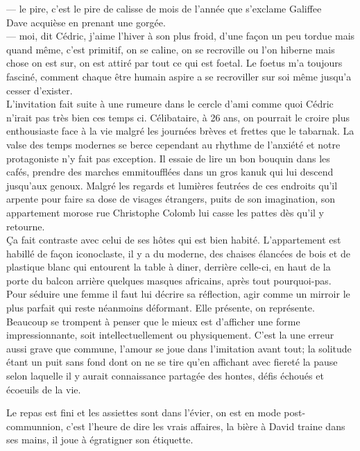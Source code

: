 \documentclass{article}
\begin{document}
--- le pire, c'est le pire de calisse de mois de l'année que s'exclame Galiffee\\
Dave acquièse en prenant une gorgée.\\
--- moi, dit Cédric, j'aime l'hiver à son plus froid, d'une façon un peu tordue mais quand même,
c'est primitif, on se caline, on se recroville ou l'on hiberne mais chose on est sur,
on est attiré par tout ce qui est foetal. Le foetus m'a toujours fasciné, comment
chaque être humain aspire a se recroviller sur soi même jusqu'a cesser d'exister.\\

L'invitation fait suite à une rumeure dans le cercle d'ami comme quoi Cédric
n'irait pas très bien ces temps ci. Célibataire, à 26 ans, on pourrait le croire
plus enthousiaste face à la vie malgré les journées brèves et frettes que le
tabarnak. La valse des temps modernes se berce cependant au rhythme de l'anxiété
et notre protagoniste n'y fait pas exception. Il essaie de lire un bon bouquin
dans les cafés, prendre des marches emmitoufflées dans un gros kanuk qui lui
descend jusqu'aux genoux. Malgré les regards et lumières feutrées de ces
endroits qu'il arpente pour faire sa dose de visages étrangers, puits de son
imagination, son appartement morose rue Christophe Colomb lui casse les pattes
dès qu'il y retourne.\\

Ça fait contraste avec celui de ses hôtes qui est bien habité. L'appartement est
habillé de façon iconoclaste, il y a du moderne, des chaises élancées de bois et
de plastique blanc qui entourent la table à diner, derrière celle-ci, en haut de
la porte du balcon arrière quelques masques africains, après tout
pourquoi-pas.\\

Pour séduire une femme il faut lui décrire sa réflection, agir comme un
mirroir le plus parfait qui reste néanmoins déformant. Elle présente,
on représente. Beaucoup se trompent à penser que le mieux est d'afficher
une forme impressionnante, soit intellectuellement ou physiquement. C'est
la une erreur aussi grave que commune, l'amour se joue dans l'imitation
avant tout; la solitude étant un puit sans fond dont on ne se tire qu'en
affichant avec fiereté la pause selon laquelle il y aurait connaissance
partagée des hontes, défis échoués et écoeuils de la vie.

Le repas est fini et les assiettes sont dans l'évier, on est en mode post-communnion,
c'est l'heure de dire les vrais affaires, la bière à David traine dans ses mains, il
joue à égratigner son étiquette.\\
\end{document}
